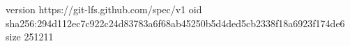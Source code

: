 version https://git-lfs.github.com/spec/v1
oid sha256:294d112ec7c922c24d83783a6f68ab45250b5d4ded5cb2338f18a6923f174de6
size 251211
